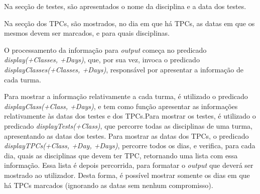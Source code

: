 \documentclass{llncs}
\begin{document}
\centerline{}

Na secção de testes, são apresentados o nome da disciplina e a data dos testes. \par
Na secção dos TPCs, são mostrados, no dia em que há TPCs, as datas em que os mesmos devem ser marcados, e para quais disciplinas.\par
O processamento da informação para \textit{output} começa no predicado \textit{display(+Classes, +Days)}, que, por sua vez, invoca o predicado \textit{displayClasses(+Classes, +Days)}, responsável por apresentar a informação de cada turma.\par
Para mostrar a informação relativamente a cada turma, é utilizado o predicado \textit{displayClass(+Class, +Days)}, e tem como função apresentar as informações relativamente às datas dos testes e dos TPCs.\newline Para mostrar os testes, é utilizado o predicado \textit{displayTests(+Class)}, que percorre todas as disciplinas de uma turma, apresentando as datas dos testes.\newline 
Para mostrar as datas dos TPCs, o predicado \textit{displayTPCs(+Class, +Day, +Days)}, percorre todos os dias, e verifica, para cada dia, quais as disciplinas que devem ter TPC, retornando uma lista com essa informação. Essa lista é depois percorrida, para formatar o \textit{output} que deverá ser mostrado ao utilizador. Desta forma, é possível mostrar somente os dias em que há TPCs marcados (ignorando as datas sem nenhum compromisso).
\end{document}
